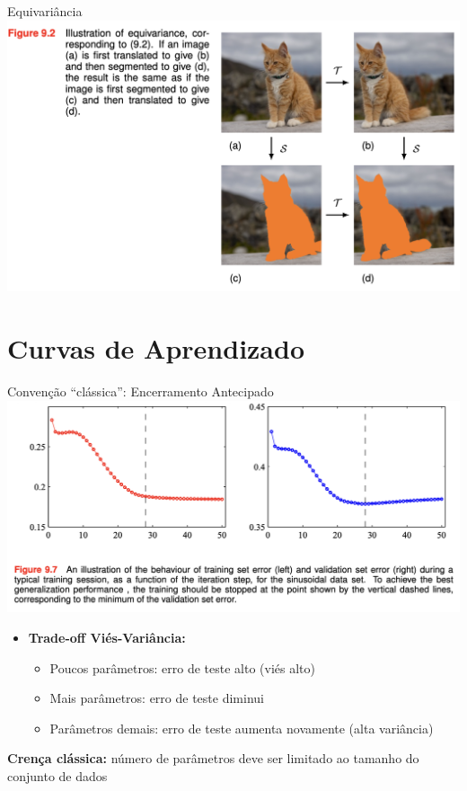 \documentclass{beamer}
\begin{document}
\begin{frame}{Equivariância}
\centering
\includegraphics[width=\textwidth,height=0.7\textheight,keepaspectratio]{imgs/bishop_example/9.png}
\end{frame}


\section{Curvas de Aprendizado}

\begin{frame}{Convenção ``clássica'': Encerramento Antecipado}
\includegraphics[width=\textwidth,height=0.5\textheight,keepaspectratio]{imgs/bishop_example/10.png}
\begin{itemize}
  \item \textbf{Trade-off Viés-Variância:}
    \begin{itemize}
      \item Poucos parâmetros: erro de teste alto (viés alto)
      \item Mais parâmetros: erro de teste diminui
      \item Parâmetros demais: erro de teste aumenta novamente (alta variância)
    \end{itemize}
\end{itemize}
\textbf{Crença clássica:} número de parâmetros deve ser limitado ao tamanho do conjunto de dados
\end{frame}
\end{document}
